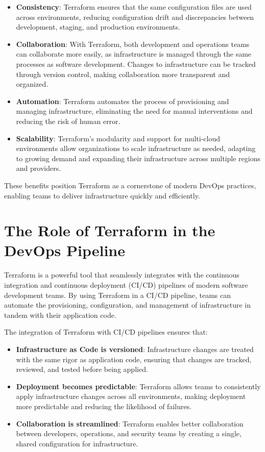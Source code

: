 \begin{itemize}
  \item \textbf{Consistency}: Terraform ensures that the same configuration files are used across environments, reducing configuration drift and discrepancies between development, staging, and production environments.
  \item \textbf{Collaboration}: With Terraform, both development and operations teams can collaborate more easily, as infrastructure is managed through the same processes as software development. Changes to infrastructure can be tracked through version control, making collaboration more transparent and organized.
  \item \textbf{Automation}: Terraform automates the process of provisioning and managing infrastructure, eliminating the need for manual interventions and reducing the risk of human error.
  \item \textbf{Scalability}: Terraform's modularity and support for multi-cloud environments allow organizations to scale infrastructure as needed, adapting to growing demand and expanding their infrastructure across multiple regions and providers.
\end{itemize}

These benefits position Terraform as a cornerstone of modern DevOps practices, enabling teams to deliver infrastructure quickly and efficiently.

\section{The Role of Terraform in the DevOps Pipeline}

Terraform is a powerful tool that seamlessly integrates with the continuous integration and continuous deployment (CI/CD) pipelines of modern software development teams. By using Terraform in a CI/CD pipeline, teams can automate the provisioning, configuration, and management of infrastructure in tandem with their application code.

The integration of Terraform with CI/CD pipelines ensures that:

\begin{itemize}
  \item \textbf{Infrastructure as Code is versioned}: Infrastructure changes are treated with the same rigor as application code, ensuring that changes are tracked, reviewed, and tested before being applied.
  \item \textbf{Deployment becomes predictable}: Terraform allows teams to consistently apply infrastructure changes across all environments, making deployment more predictable and reducing the likelihood of failures.
  \item \textbf{Collaboration is streamlined}: Terraform enables better collaboration between developers, operations, and security teams by creating a single, shared configuration for infrastructure.
\end{itemize}

